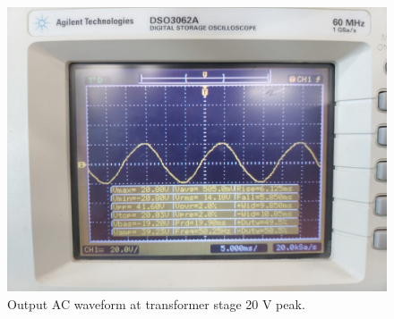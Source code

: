 \documentclass[journal,12pt,twocolumn]{IEEEtran}
\begin{document}
	\begin{figure}[!ht]
		\includegraphics[width=\columnwidth]{figs/c_1.jpg}
		\caption{Output AC waveform at transformer stage 20 V peak.}
		\label{fig:transformer}
	\end{figure}
	
\end{document}
